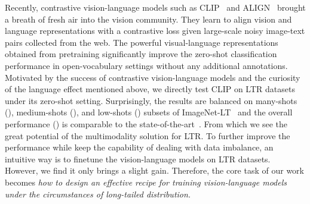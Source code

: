 \documentclass[10pt,twocolumn,letterpaper]{article}
\begin{document}
Recently, contrastive vision-language models such as CLIP~\cite{radford2021learning} and ALIGN~\cite{jia2021scaling} brought a breath of fresh air into the vision community. They learn to align vision and language representations with a contrastive loss given large-scale noisy image-text pairs collected from the web. The powerful visual-language representations obtained from pretraining significantly improve the zero-shot classification performance in open-vocabulary settings without any additional annotations.
Motivated by the success of contrastive vision-language models and the curiosity of the language effect mentioned above, we directly test CLIP on LTR datasets under its zero-shot setting.
Surprisingly, the results are balanced on many-shots (), medium-shots (), and low-shots () subsets of ImageNet-LT~\cite{liu2019large} and the overall performance () is comparable to the state-of-the-art~\cite{cui2021parametric}. From which we see the great potential of the multimodality solution for LTR. 
To further improve the performance while keep the capability of dealing with data imbalance, an intuitive way is to finetune the vision-language models on LTR datasets. However, we find it only brings a slight gain. Therefore, the core task of our work becomes \textit{how to design an effective recipe for training vision-language models under the circumstances of long-tailed distribution.} 
\end{document}
